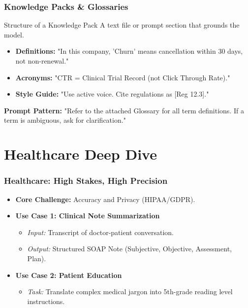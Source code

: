 \documentclass{beamer}
\begin{document}
\begin{frame}
    \frametitle{Knowledge Packs \& Glossaries}
    \begin{block}{Structure of a Knowledge Pack}
        A text file or prompt section that grounds the model.
    \end{block}
    \begin{itemize}
        \item \textbf{Definitions:} "In this company, 'Churn' means cancellation within 30 days, not non-renewal."
        \item \textbf{Acronyms:} "CTR = Clinical Trial Record (not Click Through Rate)."
        \item \textbf{Style Guide:} "Use active voice. Cite regulations as [Reg 12.3]."
    \end{itemize}
    \textbf{Prompt Pattern:} "Refer to the attached Glossary for all term definitions. If a term is ambiguous, ask for clarification."
\end{frame}

\section{Healthcare Deep Dive}

\begin{frame}
    \frametitle{Healthcare: High Stakes, High Precision}
    \begin{itemize}
        \item \textbf{Core Challenge:} Accuracy and Privacy (HIPAA/GDPR).
        \item \textbf{Use Case 1: Clinical Note Summarization}
        \begin{itemize}
            \item \textit{Input:} Transcript of doctor-patient conversation.
            \item \textit{Output:} Structured SOAP Note (Subjective, Objective, Assessment, Plan).
        \end{itemize}
        \item \textbf{Use Case 2: Patient Education}
        \begin{itemize}
            \item \textit{Task:} Translate complex medical jargon into 5th-grade reading level instructions.
        \end{itemize}
    \end{itemize}
\end{frame}
\end{document}
